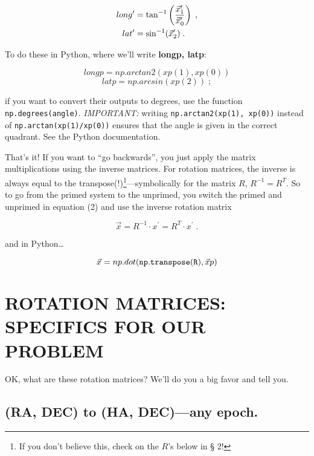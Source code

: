 \documentclass[]{article}
\begin{document}
\begin{align} 
long^\prime &= \tan^{-1} \left({{\vec x^\prime}_1 \over {\vec x^\prime}_0}\right) \; , \\ 
lat^\prime &=
\sin^{-1} ({\vec x^\prime}_2) \; .  
\end{align}

\noindent To do these in Python, where we'll write {\bf longp, latp}:

\begin{equation}
{ longp = np.arctan2(xp(1), xp(0))}
\end{equation}
\begin{equation}
{ latp = np.arcsin(xp(2))} \; ;
\end{equation}

\noindent if you want to convert their outputs to degrees, use the function
{\tt np.degrees(angle)}.  {\it IMPORTANT:} writing {\tt np.arctan2(xp(1), xp(0))} 
instead of {\tt np.arctan(xp(1)/xp(0))} ensures that the angle is given in the correct
quadrant.  See the Python documentation. 

    That's it! If you want to ``go backwards'', you just apply the
matrix multiplications using the inverse matrices.  For rotation
matrices, the inverse is always equal to the transpose(!)\footnote{If
you don't believe this, check on the ${R}$'s below in \S
2!}---symbolically for the matrix ${R}$, ${R^{-1}} = {R^T}$. 
So to go from the primed system to the unprimed, you switch the primed
and unprimed in equation (2) and use the inverse rotation matrix

\begin{equation}
{\vec x} = {R^{-1} \cdot x^\prime} = {R^T \cdot x^\prime}\; .
\end{equation}

\noindent and in Python\dots

\begin{equation} 
{\vec x} = np.dot({\tt np.transpose(R)},{\vec xp})  
\end{equation}

\section {ROTATION MATRICES: SPECIFICS FOR OUR PROBLEM}

    OK, what are these rotation matrices? We'll do you a big favor
and tell you.  

\subsection {(RA, DEC) to (HA, DEC)---any epoch.}
\end{document}
